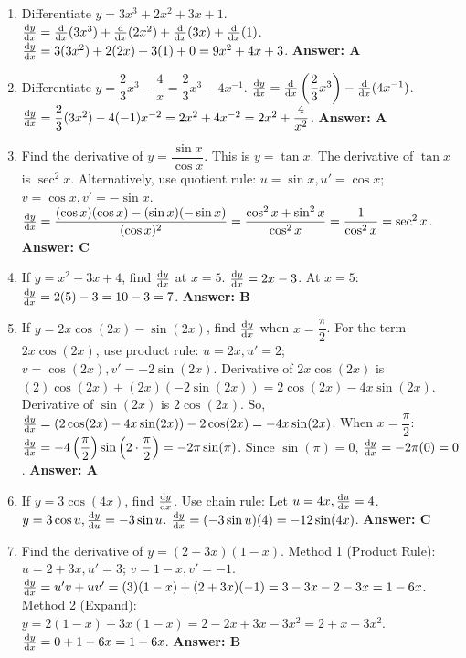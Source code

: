 \begin{enumerate}[label={\arabic*.}]
  \item Differentiate \(y = 3x^3 + 2x^2 + 3x + 1\).
    \(\frac{\mathrm{d}y}{\mathrm{d}x} = \frac{\mathrm{d}}{\mathrm{d}x}(3x^3) + \frac{\mathrm{d}}{\mathrm{d}x}(2x^2) + \frac{\mathrm{d}}{\mathrm{d}x}(3x) + \frac{\mathrm{d}}{\mathrm{d}x}(1)\).
    \(\frac{\mathrm{d}y}{\mathrm{d}x} = 3(3x^2) + 2(2x) + 3(1) + 0 = 9x^2 + 4x + 3\).
    \textbf{Answer: A}

  \item Differentiate \(y = \dfrac{2}{3}x^3 - \dfrac{4}{x} = \dfrac{2}{3}x^3 - 4x^{-1}\).
    \(\frac{\mathrm{d}y}{\mathrm{d}x} = \frac{\mathrm{d}}{\mathrm{d}x}\left(\dfrac{2}{3}x^3\right) - \frac{\mathrm{d}}{\mathrm{d}x}(4x^{-1})\).
    \(\frac{\mathrm{d}y}{\mathrm{d}x} = \dfrac{2}{3}(3x^2) - 4(-1)x^{-2} = 2x^2 + 4x^{-2} = 2x^2 + \dfrac{4}{x^2}\).
    \textbf{Answer: A}

  \item Find the derivative of \(y = \dfrac{\sin x}{\cos x}\).
    This is \(y = \tan x\). The derivative of \(\tan x\) is \(\sec^2 x\).
    Alternatively, use quotient rule: \(u=\sin x, u'=\cos x\); \(v=\cos x, v'=-\sin x\).
    \(\frac{\mathrm{d}y}{\mathrm{d}x} = \dfrac{(\cos x)(\cos x) - (\sin x)(-\sin x)}{(\cos x)^2} = \dfrac{\cos^2 x + \sin^2 x}{\cos^2 x} = \dfrac{1}{\cos^2 x} = \sec^2 x\).
    \textbf{Answer: C}

  \item If \(y = x^2 - 3x + 4\), find \(\frac{\mathrm{d}y}{\mathrm{d}x}\) at \(x=5\).
    \(\frac{\mathrm{d}y}{\mathrm{d}x} = 2x - 3\).
    At \(x=5\): \(\frac{\mathrm{d}y}{\mathrm{d}x} = 2(5) - 3 = 10 - 3 = 7\).
    \textbf{Answer: B}

  \item If \(y = 2x\cos(2x) - \sin(2x)\), find \(\frac{\mathrm{d}y}{\mathrm{d}x}\) when \(x = \dfrac{\pi}{2}\).
    For the term \(2x\cos(2x)\), use product rule: \(u=2x, u'=2\); \(v=\cos(2x), v'=-2\sin(2x)\).
    Derivative of \(2x\cos(2x)\) is \((2)\cos(2x) + (2x)(-2\sin(2x)) = 2\cos(2x) - 4x\sin(2x)\).
    Derivative of \(\sin(2x)\) is \(2\cos(2x)\).
    So, \(\frac{\mathrm{d}y}{\mathrm{d}x} = (2\cos(2x) - 4x\sin(2x)) - 2\cos(2x) = -4x\sin(2x)\).
    When \(x = \dfrac{\pi}{2}\): \(\frac{\mathrm{d}y}{\mathrm{d}x} = -4\left(\dfrac{\pi}{2}\right)\sin\left(2 \cdot \dfrac{\pi}{2}\right) = -2\pi \sin(\pi)\).
    Since \(\sin(\pi) = 0\), \(\frac{\mathrm{d}y}{\mathrm{d}x} = -2\pi(0) = 0\).
    \textbf{Answer: A}

  \item If \(y = 3\cos(4x)\), find \(\frac{\mathrm{d}y}{\mathrm{d}x}\).
    Use chain rule: Let \(u=4x, \frac{\mathrm{d}u}{\mathrm{d}x}=4\). \(y=3\cos u, \frac{\mathrm{d}y}{\mathrm{d}u}=-3\sin u\).
    \(\frac{\mathrm{d}y}{\mathrm{d}x} = (-3\sin u)(4) = -12\sin(4x)\).
    \textbf{Answer: C}

  \item Find the derivative of \(y = (2+3x)(1-x)\).
    Method 1 (Product Rule): \(u=2+3x, u'=3\); \(v=1-x, v'=-1\).
    \(\frac{\mathrm{d}y}{\mathrm{d}x} = u'v + uv' = (3)(1-x) + (2+3x)(-1) = 3 - 3x - 2 - 3x = 1 - 6x\).
    Method 2 (Expand): \(y = 2(1-x) + 3x(1-x) = 2 - 2x + 3x - 3x^2 = 2 + x - 3x^2\).
    \(\frac{\mathrm{d}y}{\mathrm{d}x} = 0 + 1 - 6x = 1 - 6x\).
    \textbf{Answer: B}


\end{enumerate}
